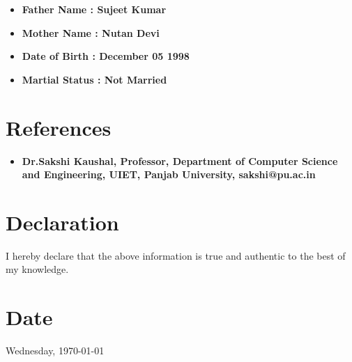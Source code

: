 \documentclass[11pt]{article}
\begin{document}
\begin{minipage}{18cm}
\begin{itemize}[leftmargin=*]
\item \bfseries Father Name : \mdseries  Sujeet Kumar
\item \bfseries Mother Name : \mdseries  Nutan Devi
\item \bfseries Date of Birth : \mdseries  December 05 1998
\item \bfseries Martial Status : \mdseries  Not Married
\end{itemize}




\section{References}
\begin{itemize}[leftmargin=*]


\item \bfseries Dr.Sakshi Kaushal, \mdseries  Professor, Department of Computer Science and Engineering, UIET, Panjab University, sakshi@pu.ac.in
\end{itemize}

\section{Declaration}
I hereby declare that the above information is true and authentic to the best of my knowledge.

\section{Date}
Wednesday, \today
\end{minipage}
\end{document}
